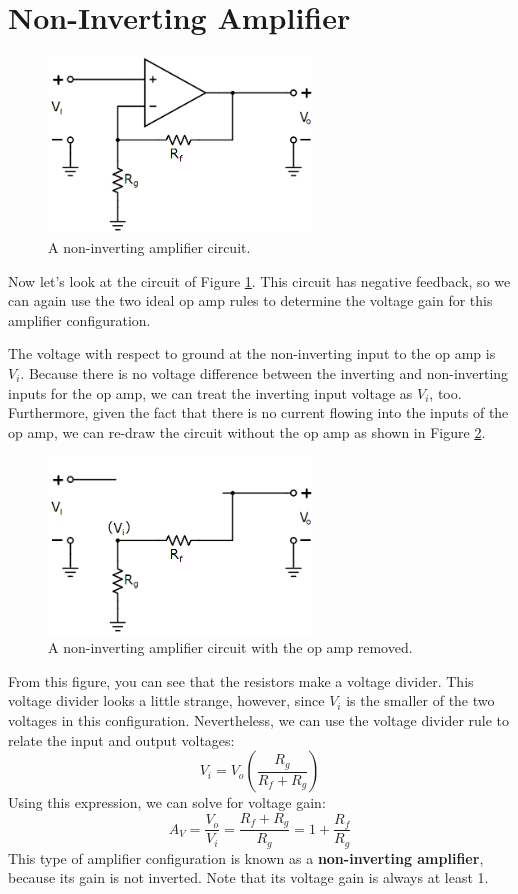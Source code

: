 \section{Non-Inverting Amplifier}
\begin{figure}[h!]
\centering
\includegraphics[width=7cm]{figures/nonInvertingAmp.png}
\caption{A non-inverting amplifier circuit.}
\label{nonInvertingAmp}
\end{figure}
Now let's look at the circuit of Figure \ref{nonInvertingAmp}. This circuit has negative feedback, so we can again use the two ideal op amp rules to determine the voltage gain for this amplifier configuration.
\par
The voltage with respect to ground at the non-inverting input to the op amp is $V_i$. Because there is no voltage difference between the inverting and non-inverting inputs for the op amp, we can treat the inverting input voltage as $V_i$, too. Furthermore, given the fact that there is no current flowing into the inputs of the op amp, we can re-draw the circuit without the op amp as shown in Figure \ref{nonInvertingSansAmp}.
\begin{figure}[h!]
\centering
\includegraphics[width=7cm]{figures/nonInvertingSansAmp.png}
\caption{A non-inverting amplifier circuit with the op amp removed.}
\label{nonInvertingSansAmp}
\end{figure}
\par
From this figure, you can see that the resistors make a voltage divider. This voltage divider looks a little strange, however, since $V_i$ is the smaller of the two voltages in this configuration. Nevertheless, we can use the voltage divider rule to relate the input and output voltages:
$$
V_i = V_o\left(\frac{R_g}{R_f+R_g}\right)
$$
Using this expression, we can solve for voltage gain:
$$
A_V = \frac{V_o}{V_i} = \frac{R_f+R_g}{R_g} = 1 + \frac{R_f}{R_g}
$$
This type of amplifier configuration is known as a \textbf{non-inverting amplifier}, because its gain is not inverted. Note that its voltage gain is always at least 1.

